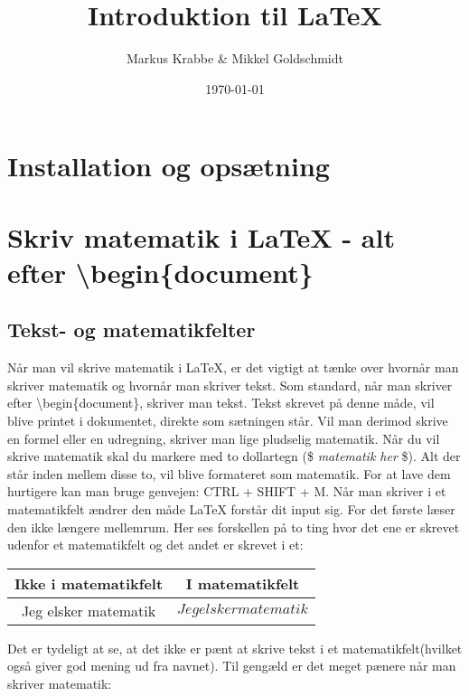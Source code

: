 \documentclass[titlepage]{article}
\title{Introduktion til \LaTeX{} }
\author{Markus Krabbe \& Mikkel Goldschmidt}
\date{\today}
\begin{document}
\maketitle

\tableofcontents
\clearpage


\setcounter{section}{-1} %

\section{Installation og opsætning}
\pagebreak

\section{Skriv matematik i \LaTeX{} - alt efter \textbackslash begin\{document\}}
\subsection{Tekst- og matematikfelter}
Når man vil skrive matematik i \LaTeX{}, er det vigtigt at tænke over hvornår man skriver matematik og hvornår man skriver tekst.
Som standard, når man skriver efter \textbackslash begin\{document\}, skriver man tekst. 
Tekst skrevet på denne måde, vil blive printet i dokumentet, direkte som sætningen står.
Vil man derimod skrive en formel eller en udregning, skriver man lige pludselig matematik.
Når du vil skrive matematik skal du markere med to dollartegn (\$ \textit{matematik her} \$).
Alt der står inden mellem disse to, vil blive formateret som matematik. 
For at lave dem hurtigere kan man bruge genvejen: CTRL + SHIFT + M.
Når man skriver i et matematikfelt ændrer den måde \LaTeX{} forstår dit input sig.
For det første læser den ikke længere mellemrum. 
Her ses forskellen på to ting hvor det ene er skrevet udenfor et matematikfelt og det andet er skrevet i et:
\bigskip

\begin{center}
\begin{tabular}{|c|c|}
	\hline Ikke i matematikfelt & I matematikfelt\\ \hline
	Jeg elsker matematik & $Jeg elsker matematik$ \\ \hline
\end{tabular}
\end{center}

Det er tydeligt at se, at det ikke er pænt at skrive tekst i et matematikfelt(hvilket også giver god mening ud fra navnet).
Til gengæld er det meget pænere når man skriver matematik:
\bigskip
\end{document}
